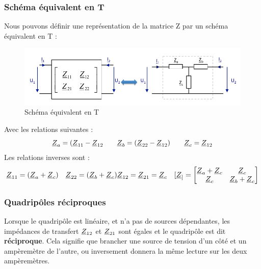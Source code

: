 \documentclass[12pt,a4paper]{article}
\newcommand{\uz}{\uline{Z} }
\begin{document}
\subsubsection{Schéma équivalent en T}
Nous pouvons définir une représentation de la matrice Z par un schéma équivalent en T :
\begin{figure}[!h]
	\centering
	\includegraphics[scale=0.65]{images/equiv_T}
	\caption{Schéma équivalent en T}
\end{figure}

\noindent Avec les relations suivantes :
\begin{equation}
	\uz_a = (\uz_{11} - \uz_{12} \qquad \uz_b = (\uz_{22} - \uz_{12}) \qquad \uz_c = \uz_{12}
\end{equation}
Les relations inverses sont :
\begin{equation}
	\uz_{11} = (\uz_a + \uz_c) \quad \uz_{22} = (\uz_b + \uz_c) \uz_{12} = \uz_{21} = \uz_c \quad [\uz_] = \begin{bmatrix}
		\uz_a + \uz_c & \uz_c\\
		\uz_c & \uz_b + \uz_c
	\end{bmatrix}
\end{equation}

\subsubsection{Quadripôles réciproques}
Lorsque le quadripôle est linéaire, et n'a pas de sources dépendantes, les impédances de transfert $\uz_{12}$ et $\uz_{21}$ sont égales et le quadripôle est dit \textbf{réciproque}. Cela signifie que brancher une source de tension d'un côté et un ampèremètre de l'autre, ou inversement donnera la même lecture sur les deux ampèremètres.
\end{document}
